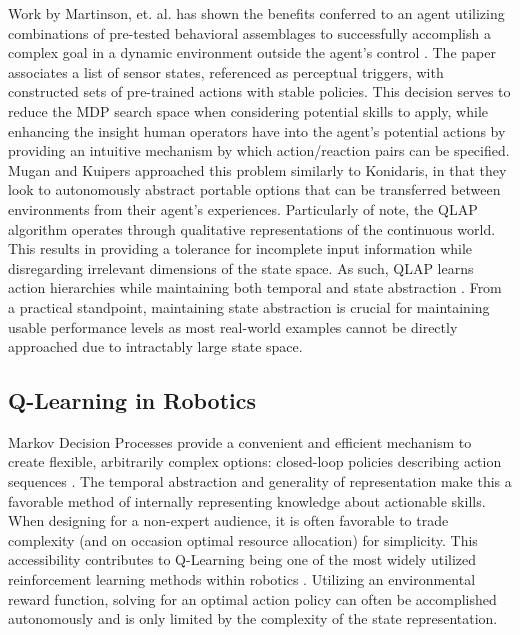 \documentclass[letterpaper]{article}
\begin{document}
Work by Martinson, et. al. has shown the benefits conferred to an agent utilizing combinations of pre-tested behavioral assemblages to successfully accomplish a complex goal in a dynamic environment outside the agent's control \cite{QLBehaviorSelection}. The paper associates a list of sensor states, referenced as perceptual triggers, with constructed sets of pre-trained actions with stable policies. This decision serves to reduce the MDP search space when considering potential skills to apply, while enhancing the insight human operators have into the agent's potential actions by providing an intuitive mechanism by which action/reaction pairs can be specified. Mugan and Kuipers approached this problem similarly to Konidaris, in that they look to autonomously abstract portable options that can be transferred between environments from their agent's experiences. Particularly of note, the QLAP algorithm operates through qualitative representations of the continuous world. This results in providing a tolerance for incomplete input information while disregarding irrelevant dimensions of the state space. As such, QLAP learns action hierarchies while maintaining both temporal and state abstraction \cite{AutoHierarchyLearning}. From a practical standpoint, maintaining state abstraction is crucial for maintaining usable performance levels as most real-world examples cannot be directly approached due to intractably large state space.

\subsection{Q-Learning in Robotics}
Markov Decision Processes provide a convenient and efficient mechanism to create flexible, arbitrarily complex options: closed-loop policies describing action sequences \cite{SuttonMDP}. The temporal abstraction and generality of representation make this a favorable method of internally representing knowledge about actionable skills. When designing for a non-expert audience, it is often favorable to trade complexity (and on occasion optimal resource allocation) for simplicity. This accessibility contributes to Q-Learning being one of the most widely utilized reinforcement learning methods within robotics \cite{QLearningWatkins}. Utilizing an environmental reward function, solving for an optimal action policy can often be accomplished autonomously and is only limited by the complexity of the state representation.
\end{document}
